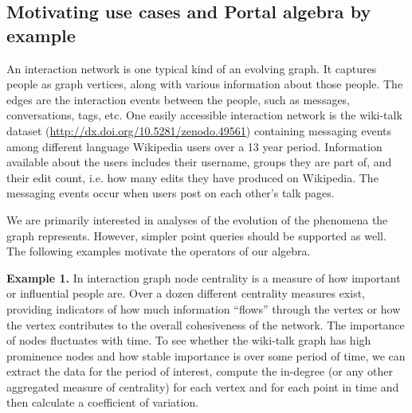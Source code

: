 \subsection{Motivating use cases and Portal algebra by example}
\label{sec:cases}

An interaction network is one typical kind of an evolving graph.  It
captures people as graph vertices, along with various information
about those people.  The edges are the interaction events between the
people, such as messages, conversations, tags, etc.  One easily
accessible interaction network is the wiki-talk dataset
(\url{http://dx.doi.org/10.5281/zenodo.49561}) containing messaging
events among different language Wikipedia users over a 13 year period.
Information available about the users includes their username, groups
they are part of, and their edit count, i.e. how many edits they have
produced on Wikipedia.  The messaging events occur when users post on
each other's talk pages.

We are primarily interested in analyses of the evolution of the
phenomena the graph represents.  However, simpler point queries should
be supported as well.  The following examples motivate the operators
of our algebra.

{\bf Example 1.}  In interaction graph node centrality is a measure
of how important or influential people are.  Over a dozen different
centrality measures exist, providing indicators of how much
information ``flows'' through the vertex or how the vertex contributes
to the overall cohesiveness of the network.  The importance of nodes
fluctuates with time.  To see whether the wiki-talk graph has high
prominence nodes and how stable importance is over some period of
time, we can extract the data for the period of interest, compute the
in-degree (or any other aggregated measure of centrality) for each
vertex and for each point in time and then calculate a coefficient of
variation.


